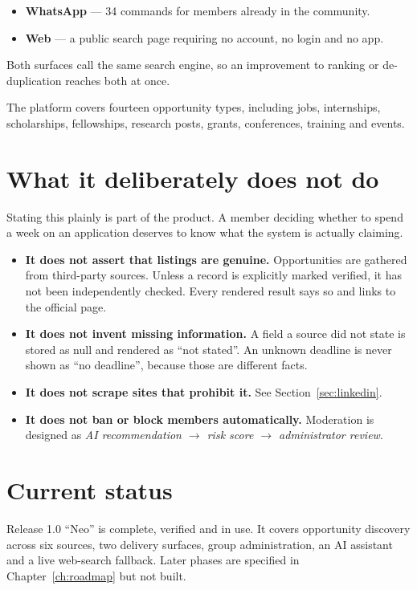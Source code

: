 \documentclass[11pt,a4paper]{report}
\newcommand{\dash}{---}
\begin{document}
\begin{itemize}
  \item \textbf{WhatsApp} \dash{} 34 commands for members already in the community.
  \item \textbf{Web} \dash{} a public search page requiring no account, no login
        and no app.
\end{itemize}

Both surfaces call the same search engine, so an improvement to ranking or
de-duplication reaches both at once.

The platform covers fourteen opportunity types, including jobs, internships,
scholarships, fellowships, research posts, grants, conferences, training and
events.

\section{What it deliberately does not do}

Stating this plainly is part of the product. A member deciding whether to spend
a week on an application deserves to know what the system is actually claiming.

\begin{itemize}
  \item \textbf{It does not assert that listings are genuine.} Opportunities
        are gathered from third-party sources. Unless a record is explicitly
        marked verified, it has not been independently checked. Every rendered
        result says so and links to the official page.
  \item \textbf{It does not invent missing information.} A field a source did
        not state is stored as null and rendered as ``not stated''. An unknown
        deadline is never shown as ``no deadline'', because those are different
        facts.
  \item \textbf{It does not scrape sites that prohibit it.} See
        Section~\ref{sec:linkedin}.
  \item \textbf{It does not ban or block members automatically.} Moderation is
        designed as \emph{AI recommendation $\rightarrow$ risk score $\rightarrow$
        administrator review}.
\end{itemize}

\section{Current status}

Release 1.0 ``Neo'' is complete, verified and in use. It covers opportunity
discovery across six sources, two delivery surfaces, group administration, an
AI assistant and a live web-search fallback. Later phases are specified in
Chapter~\ref{ch:roadmap} but not built.
\end{document}
